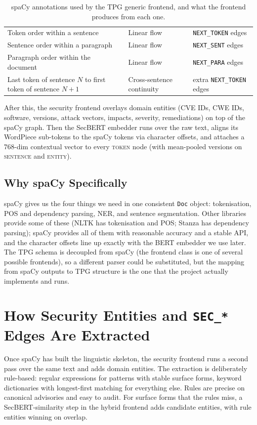 \documentclass[11pt]{article}
\begin{document}
\begin{table}[h]
\begin{tabular}{p{}p{}p{}}
Token order within a sentence & Linear flow & \texttt{NEXT\_TOKEN} edges \\
Sentence order within a paragraph & Linear flow & \texttt{NEXT\_SENT} edges \\
Paragraph order within the document & Linear flow & \texttt{NEXT\_PARA} edges \\
Last token of sentence $N$ to first token of sentence $N{+}1$ & Cross-sentence continuity & extra \texttt{NEXT\_TOKEN} edges \\
\bottomrule
\end{tabular}
\caption{spaCy annotations used by the TPG generic frontend, and what
the frontend produces from each one.}
\end{table}

After this, the security frontend overlays domain entities (CVE IDs,
CWE IDs, software, versions, attack vectors, impacts, severity,
remediations) on top of the spaCy graph. Then the SecBERT
embedder runs over the raw text, aligns its WordPiece sub-tokens to
the spaCy tokens via character offsets, and attaches a 768-dim
contextual vector to every \textsc{token} node (with mean-pooled
versions on \textsc{sentence} and \textsc{entity}).

\subsection{Why spaCy Specifically}

spaCy gives us the four things we need in one consistent
\texttt{Doc} object: tokenisation, POS and dependency parsing, NER,
and sentence segmentation. Other libraries provide some of these
(NLTK has tokenisation and POS; Stanza has dependency parsing);
spaCy provides all of them with reasonable accuracy and a stable API,
and the character offsets line up exactly with the BERT embedder we
use later. The TPG schema is decoupled from spaCy (the frontend
class is one of several possible frontends), so a different parser
could be substituted, but the mapping from spaCy outputs to TPG
structure is the one that the project actually implements and runs.

\section{How Security Entities and \texttt{SEC\_*} Edges Are Extracted}

Once spaCy has built the linguistic skeleton, the security frontend
runs a second pass over the same text and adds domain entities. The
extraction is deliberately rule-based: regular expressions for
patterns with stable surface forms, keyword dictionaries with
longest-first matching for everything else. Rules are precise on
canonical advisories and easy to audit. For surface forms that the
rules miss, a SecBERT-similarity step in the hybrid frontend adds
candidate entities, with rule entities winning on overlap.
\end{document}
